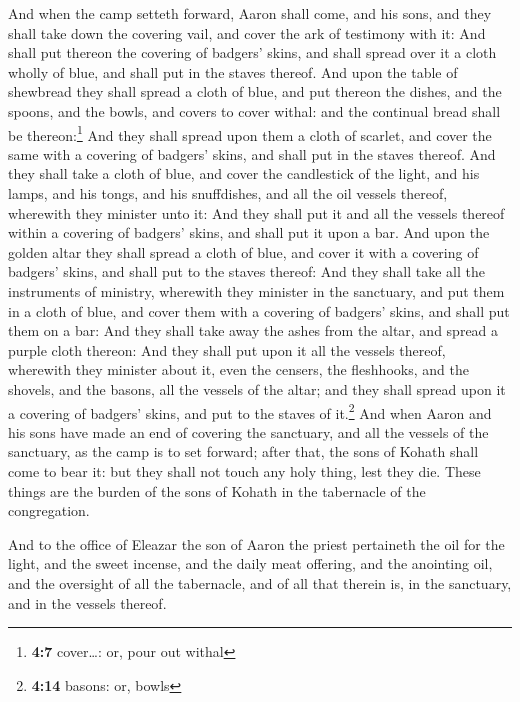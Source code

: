  And when the camp setteth forward, Aaron shall come, and
his sons, and they shall take down the covering vail, and cover the ark
of testimony with it:  And shall put thereon the covering
of badgers' skins, and shall spread over it a cloth wholly of blue, and
shall put in the staves thereof.  And upon the table of
shewbread they shall spread a cloth of blue, and put thereon the dishes,
and the spoons, and the bowls, and covers to cover withal: and the
continual bread shall be thereon:\footnote{\textbf{4:7} cover\ldots: or,
  pour out withal}  And they shall spread upon them a
cloth of scarlet, and cover the same with a covering of badgers' skins,
and shall put in the staves thereof.  And they shall take
a cloth of blue, and cover the candlestick of the light, and his lamps,
and his tongs, and his snuffdishes, and all the oil vessels thereof,
wherewith they minister unto it:  And they shall put it
and all the vessels thereof within a covering of badgers' skins, and
shall put it upon a bar.  And upon the golden altar they
shall spread a cloth of blue, and cover it with a covering of badgers'
skins, and shall put to the staves thereof:  And they
shall take all the instruments of ministry, wherewith they minister in
the sanctuary, and put them in a cloth of blue, and cover them with a
covering of badgers' skins, and shall put them on a bar: 
And they shall take away the ashes from the altar, and spread a purple
cloth thereon:  And they shall put upon it all the
vessels thereof, wherewith they minister about it, even the censers, the
fleshhooks, and the shovels, and the basons, all the vessels of the
altar; and they shall spread upon it a covering of badgers' skins, and
put to the staves of it.\footnote{\textbf{4:14} basons: or, bowls}
 And when Aaron and his sons have made an end of covering
the sanctuary, and all the vessels of the sanctuary, as the camp is to
set forward; after that, the sons of Kohath shall come to bear it: but
they shall not touch any holy thing, lest they die. These things are the
burden of the sons of Kohath in the tabernacle of the congregation.

 And to the office of Eleazar the son of Aaron the priest
pertaineth the oil for the light, and the sweet incense, and the daily
meat offering, and the anointing oil, and the oversight of all the
tabernacle, and of all that therein is, in the sanctuary, and in the
vessels thereof.

